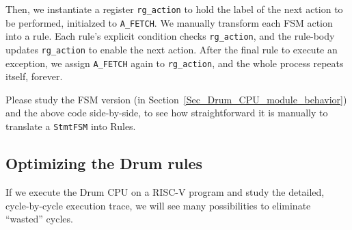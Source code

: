 Then, we instantiate a register \verb|rg_action| to hold the label of
the next action to be performed, initialzed to \verb|A_FETCH|.  We
manually transform each FSM action into a rule.  Each rule's explicit
condition checks \verb|rg_action|, and the rule-body updates
\verb|rg_action| to enable the next action.  After the final rule to
execute an exception, we assign \verb|A_FETCH| again to
\verb|rg_action|, and the whole process repeats itself, forever.


Please study the FSM version (in
Section~\ref{Sec_Drum_CPU_module_behavior}) and the above code
side-by-side, to see how straightforward it is manually to translate a
\verb|StmtFSM| into Rules.


\subsection{Optimizing the Drum rules}

If we execute the Drum CPU on a RISC-V program and study the detailed,
cycle-by-cycle execution trace, we will see many possibilities to
eliminate ``wasted'' cycles.

